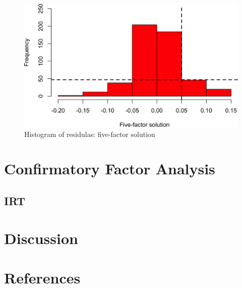 \documentclass[
  english,
  man]{apa6}
\begin{document}
\begin{figure}

{\centering \includegraphics[width=0.5\linewidth,height=0.5\textheight]{manuscript_files/figure-latex/Residuals-1} 

}

\caption{ Histogram of residulas:  five-factor solution}\label{fig:Residuals}
\end{figure}

\hypertarget{confirmatory-factor-analysis}{%
\section{Confirmatory Factor Analysis}\label{confirmatory-factor-analysis}}

\hypertarget{irt}{%
\subsection{IRT}\label{irt}}

\hypertarget{discussion}{%
\section{Discussion}\label{discussion}}

\newpage

\hypertarget{references}{%
\section{References}\label{references}}

\begingroup
\setlength{\parindent}{-0.5in}
\setlength{\leftskip}{0.5in}
\end{document}
